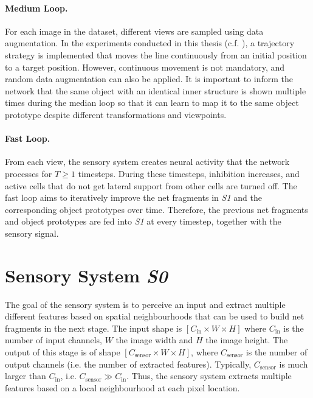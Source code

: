 \paragraph{Medium Loop.} For each image in the dataset, different views are sampled using data augmentation. In the experiments conducted in this thesis (c.f. ), a trajectory strategy is implemented that moves the line continuously from an initial position to a target position.
However, continuous movement is not mandatory, and random data augmentation can also be applied. It is important to inform the network that the same object with an identical inner structure is shown multiple times during the median loop so that it can learn to map it to the same object prototype despite different transformations and viewpoints.

\paragraph{Fast Loop.} From each view, the sensory system creates neural activity that the network processes for $T \geq 1$ timesteps. During these timesteps, inhibition increases, and active cells that do not get lateral support from other cells are turned off. 
The fast loop aims to iteratively improve the net fragments in \emph{S1} and the corresponding object prototypes over time. Therefore, the previous net fragments and object prototypes are fed into \emph{S1} at every timestep, together with the sensory signal.


\section{Sensory System \emph{S0}}
The goal of the sensory system is to perceive an input and extract multiple different features based on spatial neighbourhoods that can be used to build net fragments  in the next stage.
The input shape is $[C_{\text{in}} \times W \times H]$ where $C_{\text{in}}$ is the number of input channels, $W$ the image width and $H$ the image height.
The output of this stage is of shape $[C_{\text{sensor}} \times W \times H]$, where $C_{\text{sensor}}$ is the number of output channels (i.e. the number of extracted features). Typically, $C_{\text{sensor}}$ is much larger than $C_{\text{in}}$, i.e. $C_{\text{sensor}} \gg C_{\text{in}}$.
Thus, the sensory system extracts multiple features based on a local neighbourhood at each pixel location.

